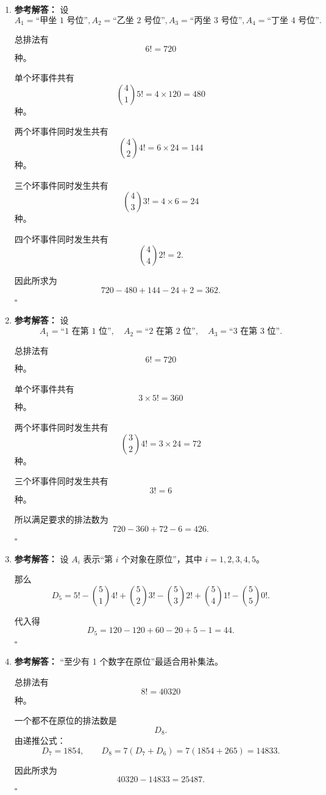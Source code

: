 \documentclass[11pt,a4paper,fontset=fandol]{ctexart}
\newenvironment{solution}{\par\noindent\textbf{参考解答：}}{\hfill$\square$\par}
\begin{document}
\begin{enumerate}
\begin{solution}
  单个坏事件：
  \[
  |A|=|B|=4!=24.
  \]

  两个坏事件同时发生：
  \[
  |A\cap B|=3!=6.
  \]

  因此满足要求的排法为
  \[
  120-24-24+6=78.
  \]
  \end{solution}

  \item \begin{solution}
  设
  \[
  A_1=\text{“甲坐 1 号位”},
  A_2=\text{“乙坐 2 号位”},
  A_3=\text{“丙坐 3 号位”},
  A_4=\text{“丁坐 4 号位”}.
  \]

  总排法有
  \[
  6!=720
  \]
  种。

  单个坏事件共有
  \[
  \binom41 5!=4\times 120=480
  \]
  种。

  两个坏事件同时发生共有
  \[
  \binom42 4!=6\times 24=144
  \]
  种。

  三个坏事件同时发生共有
  \[
  \binom43 3!=4\times 6=24
  \]
  种。

  四个坏事件同时发生共有
  \[
  \binom44 2!=2.
  \]

  因此所求为
  \[
  720-480+144-24+2=362.
  \]
  \end{solution}

  \item \begin{solution}
  设
  \[
  A_1=\text{“1 在第 1 位”},\quad
  A_2=\text{“2 在第 2 位”},\quad
  A_3=\text{“3 在第 3 位”}.
  \]

  总排法有
  \[
  6!=720
  \]
  种。

  单个坏事件共有
  \[
  3\times 5!=360
  \]
  种。

  两个坏事件同时发生共有
  \[
  \binom32 4!=3\times 24=72
  \]
  种。

  三个坏事件同时发生共有
  \[
  3!=6
  \]
  种。

  所以满足要求的排法数为
  \[
  720-360+72-6=426.
  \]
  \end{solution}

  \item \begin{solution}
  设 $A_i$ 表示“第 $i$ 个对象在原位”，其中 $i=1,2,3,4,5$。

  那么
  \[
  D_5=5!-\binom51 4!+\binom52 3!-\binom53 2!+\binom54 1!-\binom55 0!.
  \]

  代入得
  \[
  D_5=120-120+60-20+5-1=44.
  \]
  \end{solution}

  \item \begin{solution}
  “至少有 1 个数字在原位”最适合用补集法。

  总排法有
  \[
  8!=40320
  \]
  种。

  一个都不在原位的排法数是
  \[
  D_8.
  \]
  由递推公式：
  \[
  D_7=1854,
  \qquad
  D_8=7(D_7+D_6)=7(1854+265)=14833.
  \]

  因此所求为
  \[
  40320-14833=25487.
  \]
  \end{solution}
\end{enumerate}
\end{document}
